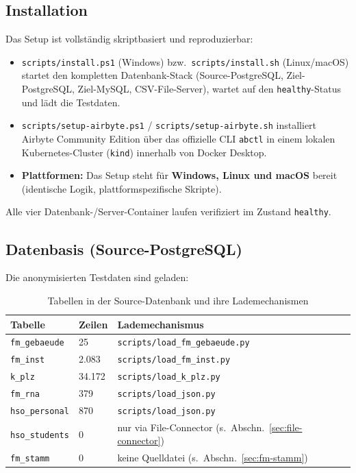 \documentclass[a4paper,12pt]{article}
\begin{document}
\subsection{Installation}
 
Das Setup ist vollständig skriptbasiert und reproduzierbar:
\begin{itemize}[noitemsep, leftmargin=*]
    \item \texttt{scripts/install.ps1} (Windows) bzw.\ \texttt{scripts/install.sh}
          (Linux/macOS) startet den kompletten Datenbank-Stack (Source-PostgreSQL,
          Ziel-PostgreSQL, Ziel-MySQL, CSV-File-Server), wartet auf den
          \texttt{healthy}-Status und lädt die Testdaten.
    \item \texttt{scripts/setup-airbyte.ps1} / \texttt{scripts/setup-airbyte.sh}
          installiert Airbyte Community Edition über das offizielle CLI \texttt{abctl}
          in einem lokalen Kubernetes-Cluster (\texttt{kind}) innerhalb von Docker Desktop.
    \item \textbf{Plattformen:} Das Setup steht für \textbf{Windows, Linux und macOS} bereit
          (identische Logik, plattformspezifische Skripte).
\end{itemize}
Alle vier Datenbank-/Server-Container laufen verifiziert im Zustand \texttt{healthy}.
 
\subsection{Datenbasis (Source-PostgreSQL)}
 
Die anonymisierten Testdaten sind geladen:
 
\begin{table}[H]
    \caption{Tabellen in der Source-Datenbank und ihre Lademechanismen}
    \centering\small
    \begin{tabular}{@{}L{4.8cm}R{2.2cm}L{6.5cm}@{}}
        \toprule
        \textbf{Tabelle} & \textbf{Zeilen} & \textbf{Lademechanismus} \\
        \midrule
        \texttt{fm\_gebaeude}  &      25 & \texttt{scripts/load\_fm\_gebaeude.py} \\
        \texttt{fm\_inst}      &   2.083 & \texttt{scripts/load\_fm\_inst.py} \\
        \texttt{k\_plz}        &  34.172 & \texttt{scripts/load\_k\_plz.py} \\
        \texttt{fm\_rna}       &     379 & \texttt{scripts/load\_json.py} \\
        \texttt{hso\_personal} &     870 & \texttt{scripts/load\_json.py} \\
        \texttt{hso\_students} &       0 &
            nur via File-Connector (s.\ Abschn.~\ref{sec:file-connector}) \\
        \texttt{fm\_stamm}     &       0 &
            keine Quelldatei (s.\ Abschn.~\ref{sec:fm-stamm}) \\
        \bottomrule
    \end{tabular}
\end{table}
 
\end{document}
